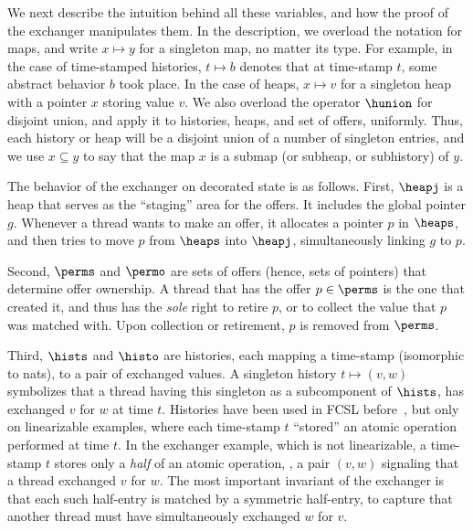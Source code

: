 We next describe the intuition behind all these variables, and how the
proof of the exchanger manipulates them. In the description, we
overload the notation for maps, and write $x \mapsto y$ for a
singleton map, no matter its type. For example, in the case of
time-stamped histories, $t \mapsto b$ denotes that at time-stamp $t$,
some abstract behavior $b$ took place. In the case of heaps, $x
\mapsto v$ for a singleton heap with a pointer $x$ storing value
$v$. We also overload the operator $\hunion$ for disjoint union, and
apply it to histories, heaps, and set of offers, uniformly. Thus, each
history or heap will be a disjoint union of a number of singleton
entries, and we use $x \subseteq y$ to say that the map $x$ is a
submap (or subheap, or subhistory) of $y$.

The behavior of the exchanger on decorated state is as follows. 
%
First, $\heapj$ is a heap that serves as the ``staging'' area for the
offers. It includes the global pointer $g$. Whenever a thread wants to
make an offer, it allocates a pointer $p$ in $\heaps$, and then tries
to move $p$ from $\heaps$ into $\heapj$, simultaneously linking $g$ to
$p$.

Second, $\perms$ and $\permo$ are sets of offers (hence, sets of
pointers) that determine offer ownership. A thread that has the offer
$p \in \perms$ is the one that created it, and thus has the
\emph{sole} right to retire $p$, or to collect the value that $p$ was
matched with. Upon collection or retirement, $p$ is removed from
$\perms$.


Third, $\hists$ and $\histo$ are histories, each mapping a time-stamp
(isomorphic to nats), to a pair of exchanged values. A singleton
history $t \mapsto (v, w)$ symbolizes that a thread having this
singleton as a subcomponent of $\hists$, has exchanged $v$ for $w$ at
time $t$. Histories have been used in FCSL
before~\cite{Sergey-al:ESOP15}, but only on linearizable examples,
where each time-stamp $t$ ``stored'' an atomic operation performed at
time $t$. In the exchanger example, which is not linearizable, a
time-stamp $t$ stores only a \emph{half} of an atomic operation, \ie,
a pair $(v, w)$ signaling that a thread exchanged $v$ for $w$. The
most important invariant of the exchanger is that each such half-entry
is matched by a symmetric half-entry, to capture that another thread
must have simultaneously exchanged $w$ for $v$.


